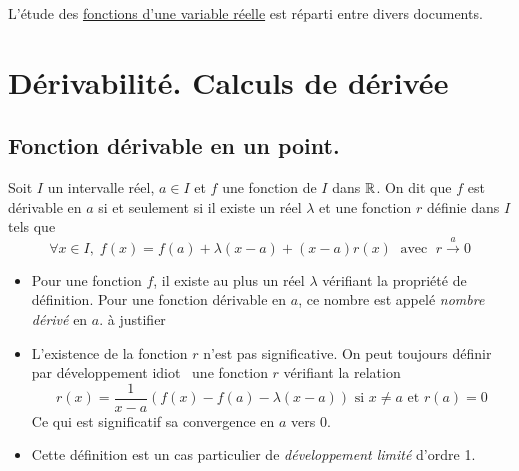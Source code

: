 
\newcommand{\interFF}[2]{\left[ #1 , #2 \right] }
\newcommand{\interFO}[2]{\left[ #1 , #2 \right[ }
\newcommand{\interOF}[2]{\left] #1 , #2 \right] }
\newcommand{\interOO}[2]{\left] #1 , #2 \right[ }


L'étude des \href{\baseurl C2063.pdf}{fonctions d'une variable réelle} est réparti entre divers documents.
\section{Dérivabilité. Calculs de dérivée}
\subsection{Fonction dérivable en un point.}
\begin{defi}
Soit $I$ un intervalle réel, $a\in I$ et $f$ une fonction de $I$ dans $\mathbb{R}$. On dit que $f$ est dérivable en $a$ si et seulement si il existe un réel $\lambda$ et une fonction $r$ définie dans $I$ tels que 
\begin{displaymath}
\forall x\in I,\; f(x) = f(a) + \lambda(x-a) + (x-a)r(x) \; \text{ avec } \; r\xrightarrow{a} 0
\end{displaymath}
\end{defi}
\begin{rems}
\begin{itemize}
  \item Pour une fonction $f$, il existe au plus un réel $\lambda$ vérifiant la propriété de définition. Pour une fonction dérivable en $a$, ce nombre est appelé \emph{nombre dérivé} en $a$. \newline 
  à justifier
  \item L'existence de la fonction $r$ n'est pas significative. On peut toujours définir par \og développement idiot\fg~  une fonction $r$ vérifiant la relation
\begin{displaymath}
  r(x) = \frac{1}{x-a}\left( f(x) - f(a) - \lambda(x-a)\right) \text{ si } x\neq a \text{ et } r(a)=0
\end{displaymath}
Ce qui est significatif sa convergence en $a$ vers $0$.
\item Cette définition est un cas particulier de \emph{développement limité} d'ordre 1.
\end{itemize}
\end{rems}

